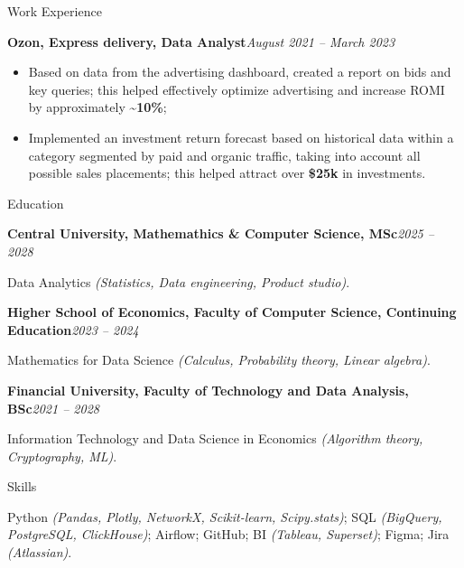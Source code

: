 \documentclass[]{mcdowellcv}
\renewenvironment{cvsubsection}[2]{%
  \begin{adjustwidth}{\subsectionmargin}{\subsectionmargin}%
    {\bfseries #1}\hfill #2\par\vspace{0.5em}%
}{%
  \end{adjustwidth}%
  \vspace*{\aftersubsectionspace}%
}
\begin{document}
\begin{cvsection}{\Large Work Experience}
		\begin{cvsubsection}{Ozon, Express delivery, Data Analyst}{\textit{August 2021 -- March 2023}}
			\begin{itemize}
				\item Based on data from the advertising dashboard, created a report on bids and key queries; this helped effectively optimize advertising and increase ROMI by approximately \textbf{\textasciitilde 10\%};
				\item Implemented an investment return forecast based on historical data within a category segmented by paid and organic traffic, taking into account all possible sales placements; this helped attract over \textbf{\$25k} in investments.
			\end{itemize}
		\end{cvsubsection}
	\end{cvsection}
	
	\begin{cvsection}{\Large Education}
		\begin{cvsubsection}{Central University, Mathemathics \& Computer Science, MSc}{\textit{2025 -- 2028}}
			\vspace{-3.1em}
			\begin{cvsubsection}{}{}{}  
        		Data Analytics \textit{(Statistics, Data engineering, Product studio)}.
			\end{cvsubsection}
		\end{cvsubsection}
		\begin{cvsubsection}{Higher School of Economics, Faculty of Computer Science, Continuing Education}{\textit{2023 -- 2024}}
			\vspace{-3.1em}
			\begin{cvsubsection}{}{}{}  
        		Mathematics for Data Science \textit{(Calculus, Probability theory, Linear algebra)}.
			\end{cvsubsection}
		\end{cvsubsection}
		\begin{cvsubsection}{Financial University, Faculty of Technology and Data Analysis, BSc}{\textit{2021 -- 2028}}
			\vspace{-3.1em}
			\begin{cvsubsection}{}{}{}  
        		Information Technology and Data Science in Economics \textit{(Algorithm theory, Cryptography, ML)}.
			\end{cvsubsection}
		\end{cvsubsection}
	\end{cvsection}
	
	\begin{cvsection}{\Large Skills}
	\vspace{-1.55em}
	\begin{cvsubsection}{}{}{}  
		Python \textit{(Pandas, Plotly, NetworkX, Scikit-learn, Scipy.stats)}; SQL \textit{(BigQuery, PostgreSQL, ClickHouse)}; Airflow; GitHub; BI \textit{(Tableau, Superset)}; Figma; Jira \textit{(Atlassian)}.
	\end{cvsubsection}
	\end{cvsection}
	
\end{document}
